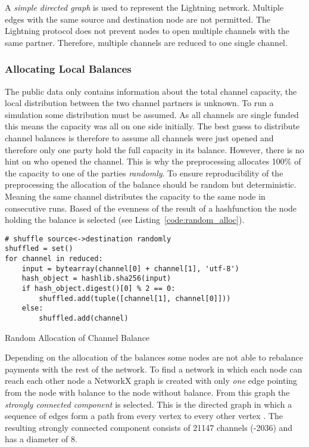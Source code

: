 \documentclass[final]{fhnwreport}       %
\begin{document}
A \emph{simple directed graph} is used to represent the Lightning network. Multiple edges with the same source and destination node are not permitted. The Lightning protocol does not prevent nodes to open multiple channels with the same partner. Therefore, multiple channels are reduced to one single channel.

\subsubsection{Allocating Local Balances}
The public data only contains information about the total channel capacity, the local distribution between the two channel partners is unknown. To run a simulation some distribution must be assumed. As all channels are single funded this means the capacity was all on one side initially. The best guess to distribute channel balances is therefore to assume all channels were just opened and therefore only one party hold the full capacity in its balance. However, there is no hint on who opened the channel. This is why the preprocessing allocates 100\% of the capacity to one of the parties \emph{randomly}. To ensure reproducibility of the preprocessing the allocation of the balance should be random but deterministic. Meaning the same channel distributes the capacity to the same node in consecutive runs. Based of the evenness of the result of a \gls{hashfunction} the node holding the balance is selected (see Listing~\ref{code:random_alloc}).

\begin{listing}[H]
  \begin{verbatim}
# shuffle source<->destination randomly
shuffled = set()
for channel in reduced:
    input = bytearray(channel[0] + channel[1], 'utf-8')
    hash_object = hashlib.sha256(input)
    if hash_object.digest()[0] % 2 == 0:
        shuffled.add(tuple([channel[1], channel[0]]))
    else:
        shuffled.add(channel) 
  \end{verbatim}
  \caption{Random Allocation of Channel Balance}
  \label{code:random_alloc}
\end{listing}

Depending on the allocation of the balances some nodes are not able to rebalance payments with the rest of the network. To find a network in which each node can reach each other node a NetworkX graph is created with only \emph{one} edge pointing from the node with balance to the node without balance. From this graph the \emph{strongly connected component} is selected. This is the directed graph in which a sequence of edges form a path from every vertex to every other vertex \citep{even_network_1975}. The resulting strongly connected component consists of 21147 channels (-2036) and has a diameter of 8.
\end{document}
